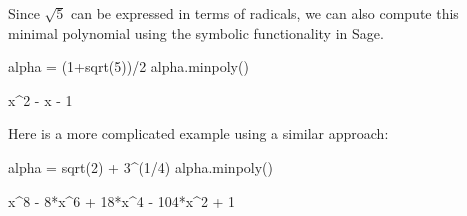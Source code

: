 Since $\sqrt{5}$ can be expressed in terms of radicals, we can also
compute this minimal polynomial using the symbolic functionality in
Sage.
\begin{sagecode}
\begin{sagecell}
alpha = (1+sqrt(5))/2
alpha.minpoly()
\end{sagecell}
\begin{sageout}
x^2 - x - 1
\end{sageout}
Here is a more complicated example using a similar approach:
\begin{sagecell}
alpha = sqrt(2) + 3^(1/4)
alpha.minpoly()
\end{sagecell}
\begin{sageout}
x^8 - 8*x^6 + 18*x^4 - 104*x^2 + 1
\end{sageout}
\end{sagecode}

